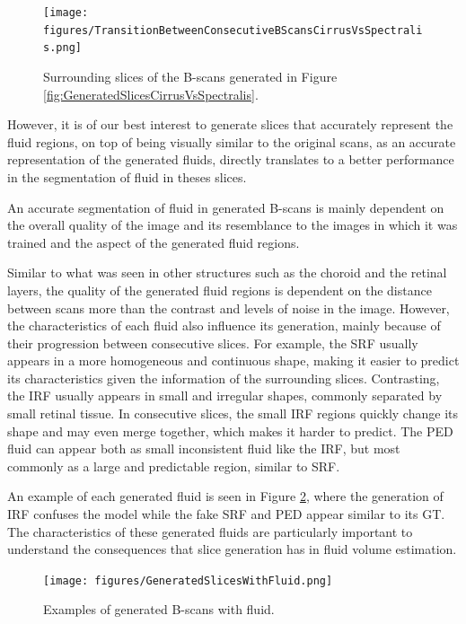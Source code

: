 \begin{figure}
	\centering	\texttt{[image: figures/TransitionBetweenConsecutiveBScansCirrusVsSpectralis.png]}
	\caption{Surrounding slices of the B-scans generated in Figure \ref{fig:GeneratedSlicesCirrusVsSpectralis}.}
	\label{fig:TransitionBetweenConsecutiveBScansCirrusVsSpectralis}
\end{figure}

However, it is of our best interest to generate slices that accurately represent the fluid regions, on top of being visually similar to the original scans, as an accurate representation of the generated fluids, directly translates to a better performance in the segmentation of fluid in theses slices. 
\par
An accurate segmentation of fluid in generated B-scans is mainly dependent on the overall quality of the image and its resemblance to the images in which it was trained and the aspect of the generated fluid regions.
\par
Similar to what was seen in other structures such as the choroid and the retinal layers, the quality of the generated fluid regions is dependent on the distance between scans more than the contrast and levels of noise in the image. However, the characteristics of each fluid also influence its generation, mainly because of their progression between consecutive slices. For example, the SRF usually appears in a more homogeneous and continuous shape, making it easier to predict its characteristics given the information of the surrounding slices. Contrasting, the IRF usually appears in small and irregular shapes, commonly separated by small retinal tissue. In consecutive slices, the small IRF regions quickly change its shape and may even merge together, which makes it harder to predict. The PED fluid can appear both as small inconsistent fluid like the IRF, but most commonly as a large and predictable region, similar to SRF.
\par
An example of each generated fluid is seen in Figure \ref{fig:GeneratedSlicesWithFluid}, where the generation of IRF confuses the model while the fake SRF and PED appear similar to its GT. The characteristics of these generated fluids are particularly important to understand the consequences that slice generation has in fluid volume estimation.

\begin{figure}
	\centering	\texttt{[image: figures/GeneratedSlicesWithFluid.png]}
	\caption{Examples of generated B-scans with fluid.}
	\label{fig:GeneratedSlicesWithFluid}
\end{figure}


